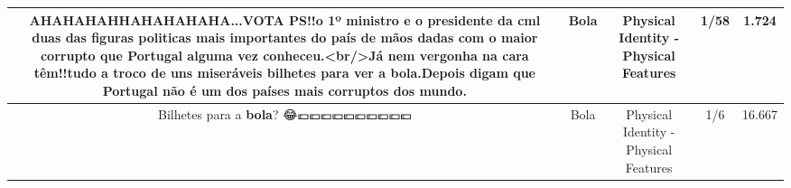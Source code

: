 \documentclass[11pt]{article}
\newlength\mylength
\begin{document}
\begin{center}
\begin{longtable}{|C{.65\mylength}|C{.30\mylength}|C{.12\mylength}|C{.12\mylength}|C{.12\mylength}|}
  \small AHAHAHAHHAHAHAHAHA...VOTA PS!!o 1º ministro e o presidente da cml duas das figuras politicas mais importantes do país de mãos dadas com o maior corrupto que Portugal alguma vez conheceu.<br/>Já nem vergonha na cara têm!!tudo a troco de uns miseráveis bilhetes para ver a \textbf{bola}.Depois digam que Portugal não é um dos países mais corruptos dos mundo.\normalsize   & Bola & Physical Identity - Physical Features & 1/58 & 1.724 \\  \hline
  \small Bilhetes para a \textbf{bola}? 😂💶💶💶💶💶💶💶💶💶💶\normalsize   & Bola & Physical Identity - Physical Features & 1/6 & 16.667 \\  \hline
  
\end{longtable}
\end{center}
\end{document}
